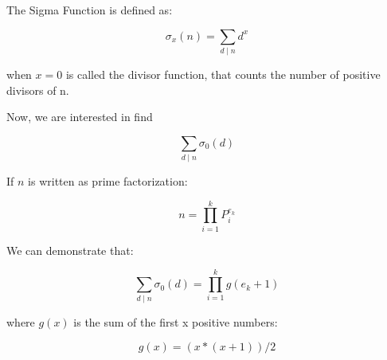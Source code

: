 The Sigma Function is defined as:

$$
  \sigma_x(n)=\sum_{d\mid n} d^x
$$

when $x = 0$ is called the divisor function, that counts the number
of positive divisors of n.


Now, we are interested in find

$$
  \sum_{d\mid n} \sigma_0(d)
$$

If $n$ is written as prime factorization:

$$
  n = \prod_{i = 1}^{k} P_{i}^{e_k}
$$

We can demonstrate that:

$$
  \sum_{d\mid n} \sigma_0(d) = \prod_{i = 1}^{k} g(e_k + 1)
$$

where $g(x)$ is the sum of the first x positive numbers:

$$
  g(x) = (x * (x + 1)) / 2
$$